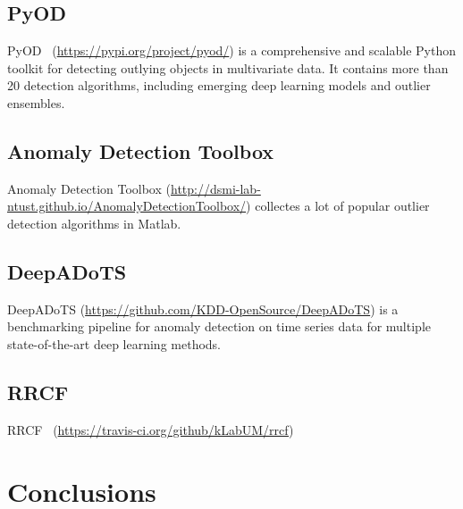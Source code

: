 \subsection{PyOD}

PyOD~\cite{zhao2019pyod} (\href{https://pypi.org/project/pyod/}{https://pypi.org/project/pyod/})
is a comprehensive and scalable Python toolkit for
detecting outlying objects in multivariate data.
It contains more than 20 detection algorithms,
including emerging deep learning models and
outlier ensembles.

\subsection{Anomaly Detection Toolbox}

Anomaly Detection Toolbox
(\href{http://dsmi-lab-ntust.github.io/AnomalyDetectionToolbox/}{http://dsmi-lab-ntust.github.io/AnomalyDetectionToolbox/})
collectes a lot of popular outlier detection algorithms in Matlab.

\subsection{DeepADoTS}

DeepADoTS (\href{https://github.com/KDD-OpenSource/DeepADoTS}{https://github.com/KDD-OpenSource/DeepADoTS})
is a benchmarking pipeline for anomaly detection on
time series data for
multiple state-of-the-art deep learning methods.

\subsection{RRCF}

RRCF~\cite{bartos_2019_rrcf} (\href{https://travis-ci.org/github/kLabUM/rrcf}{https://travis-ci.org/github/kLabUM/rrcf})



\section{Conclusions} \label{sec-conclusions}






